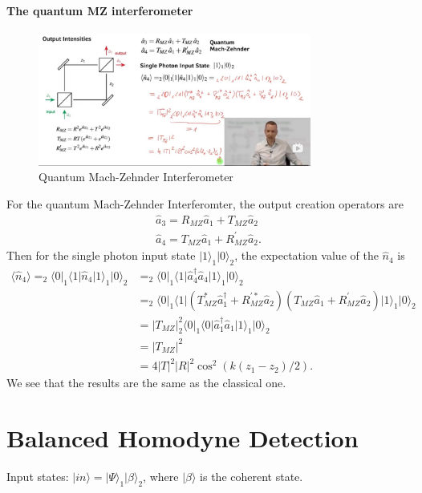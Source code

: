 \documentclass[../../note.tex]{subfiles}
\begin{document}
\paragraph{The quantum MZ interferometer}
\begin{figure}[!htbp]
	\centering
	\includegraphics[width=0.80\textwidth]{../figures/qmz.jpg}
	\caption{Quantum Mach-Zehnder Interferometer}
	\label{fig: mz}
\end{figure}
For the quantum Mach-Zehnder Interferomter, the output creation operators are
\begin{align}
    \hat{a}_3 = R_{MZ} \hat{a}_1 + T_{MZ} \hat{a}_2 \\
    \hat{a}_4 = T_{MZ} \hat{a}_1 + R_{MZ}^{\prime} \hat{a}_2.
\end{align}
Then for the single photon input state $\vert 1 \rangle_1 \vert 0 \rangle_2$, the expectation value of the $\hat{n}_4$ is 
\begin{align}
    \langle \hat{n}_4 \rangle = _2 \langle 0 \vert _1\langle 1 \vert \hat{n}_4 \vert 1 \rangle_1 \vert 0 \rangle_2 
    &= _2 \langle 0 \vert _1\langle 1 \vert \hat{a}_4^\dagger \hat{a}_4 \vert 1 \rangle_1 \vert 0 \rangle_2 \\
    &= _2 \langle 0 \vert _1\langle 1 \vert (T_{MZ}^\ast \hat{a}_1^\dagger + R_{MZ}^{\prime \ast} \hat{a}_2)(T_{MZ} \hat{a}_1 + R_{MZ}^{\prime} \hat{a}_2) \vert 1 \rangle_1 \vert 0 \rangle_2 \\
    &= \vert T_{MZ} \vert^2 _2\langle 0 \vert _1\langle 0 \vert \hat{a}_1^\dagger \hat{a}_1 \vert 1 \rangle_1 \vert 0 \rangle_2 \\
    &= \vert T_{MZ} \vert^2  \\
    &= 4 \vert T \vert^2 \vert R \vert^2 \cos^2(k(z_1 - z_2)/2).
\end{align}
We see that the results are the same as the classical one.


\section{Balanced Homodyne Detection}
Input states: $\vert in \rangle = \vert \Psi \rangle_1 \vert \beta \rangle_2$, where $\vert \beta \rangle$ is the coherent state.
\end{document}
